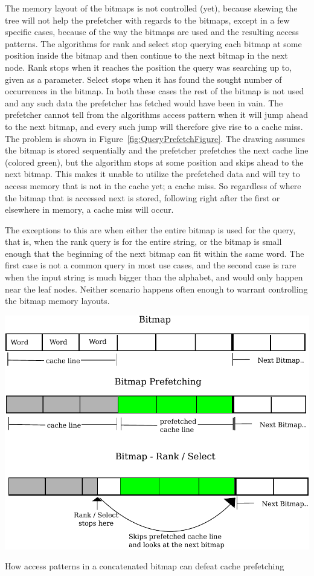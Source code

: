 The memory layout of the bitmaps is not controlled (yet), because skewing the tree will not help the prefetcher with regards to the bitmaps, except in a few specific cases, because of the way the bitmaps are used and the resulting access patterns.
The algorithms for rank and select stop querying each bitmap at some position inside the bitmap and then continue to the next bitmap in the next node.
Rank stops when it reaches the position the query was searching up to, given as a parameter.
Select stops when it has found the sought number of occurrences in the bitmap.
In both these cases the rest of the bitmap is not used and any such data the prefetcher has fetched would have been in vain.
The prefetcher cannot tell from the algorithms access pattern when it will jump ahead to the next bitmap, and every such jump will therefore give rise to a cache miss.
The problem is shown in Figure~\ref{fig:QueryPrefetchFigure}. The drawing assumes the bitmap is stored sequentially and the prefetcher prefetches the next cache line (colored green), but the algorithm stops at some position and skips ahead to the next bitmap. 
This makes it unable to utilize the prefetched data and will try to access memory that is not in the cache yet; a cache miss.
So regardless of where the bitmap that is accessed next is stored, following right after the first or elsewhere in memory, a cache miss will occur.

The exceptions to this are when either the entire bitmap is used for the query, that is, when the rank query is for the entire string, or the bitmap is small enough that the beginning of the next bitmap can fit within the same word.
The first case is not a common query in most use cases, and the second case is rare when the input string is much bigger than the alphabet, and would only happen near the leaf nodes.
Neither scenario happens often enough to warrant controlling the bitmap memory layouts.

\figureBegin

\includegraphics[width=\textwidth]{QueryPrefetchFigure.pdf}
\caption{How access patterns in a concatenated bitmap can defeat cache prefetching}
\label{fig:QueryPrefetchFigure}
\figureEnd



